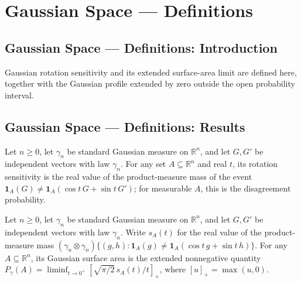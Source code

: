 \section{Gaussian Space --- Definitions}
\subsection*{Gaussian Space --- Definitions: Introduction}
Gaussian rotation sensitivity and its extended surface-area limit are defined here, together with the Gaussian profile extended by zero outside the open probability interval.

\subsection*{Gaussian Space --- Definitions: Results}

\begin{definition}
\leanok
{}
Let $n\ge0$, let $\gamma_n$ be standard Gaussian measure on $\mathbb R^n$, and let $G,G\prime$ be independent vectors with law $\gamma_n$. For any set $A\subseteq\mathbb R^n$ and real $t$, its rotation sensitivity is the real value of the product-measure mass of the event $\mathbf1_A(G)\ne\mathbf1_A(\cos t\,G+\sin t\,G\prime)$; for measurable $A$, this is the disagreement probability.
\end{definition}

\begin{definition}
\leanok
{}
Let $n\ge0$, let $\gamma_n$ be standard Gaussian measure on $\mathbb R^n$, and let $G,G\prime$ be independent vectors with law $\gamma_n$. Write $s_A(t)$ for the real value of the product-measure mass $(\gamma_n\otimes\gamma_n)\{(g,h):\mathbf1_A(g)\ne\mathbf1_A(\cos t\,g+\sin t\,h)\}$. For any $A\subseteq\mathbb R^n$, its Gaussian surface area is the extended nonnegative quantity $P_\gamma(A)=\liminf_{t\to0^+}[\sqrt{\pi/2}\,s_A(t)/t]_+$, where $[u]_+=\max(u,0)$.
\end{definition}

